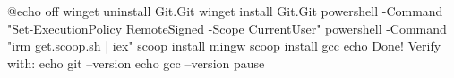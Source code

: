 @echo off
winget uninstall Git.Git
winget install Git.Git
powershell -Command "Set-ExecutionPolicy RemoteSigned -Scope CurrentUser"
powershell -Command "irm get.scoop.sh | iex"
scoop install mingw
scoop install gcc
echo Done! Verify with:
echo git --version
echo gcc --version
pause
